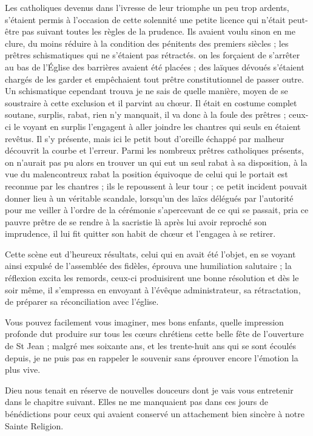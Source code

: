 \documentclass[11pt,a4paper]{report}
\begin{document}
Les catholiques devenus dans l'ivresse de leur triomphe un peu trop ardents, s'étaient permis à l'occasion de cette solennité une petite licence qui n'était peut-être pas suivant toutes les règles de la prudence. Ils avaient voulu sinon en me clure, du moins réduire à la condition des pénitents des premiers siècles ; les prêtres schismatiques qui ne s'étaient pas rétractés. on les forçaient de s'arrêter au bas de l'Église des barrières avaient été placées ; des laïques dévoués s'étaient chargés de les garder et empêchaient tout prêtre constitutionnel de passer outre. Un schismatique cependant trouva je ne sais de quelle manière, moyen de se soustraire à cette exclusion et il parvint au chœur. Il était en costume complet soutane, surplis, rabat, rien n'y manquait, il va donc à la foule des prêtres ; ceux-ci le voyant en surplis l'engagent à aller joindre les chantres qui seuls en étaient revêtus. Il s'y présente, mais ici le petit bout d'oreille échappé par malheur découvrit la courbe et l'erreur. Parmi les nombreux prêtres catholiques présents, on n'aurait pas pu alors en trouver un qui eut un seul rabat à sa disposition, à la vue du malencontreux rabat la position équivoque de celui qui le portait est reconnue par les chantres ; ils le repoussent à leur tour ; ce petit incident pouvait donner lieu à un véritable scandale, lorsqu'un des laïcs délégués par l'autorité pour me veiller à l'ordre de la cérémonie s'apercevant de ce qui se passait, pria ce pauvre prêtre de se rendre à la sacristie là après lui avoir reproché son imprudence, il lui fit quitter son habit de chœur et l'engagea à se retirer.

Cette scène eut d'heureux résultats, celui qui en avait été l'objet, en se voyant ainsi expulsé de l'assemblée des fidèles, éprouva une humiliation salutaire ; la réflexion excita les remords, ceux-ci produisirent une bonne résolution et dès le soir même, il s'empressa en envoyant à l'évêque administrateur, sa rétractation, de préparer sa réconciliation avec l'église.

Vous pouvez facilement vous imaginer, mes bons enfants, quelle impression profonde dut produire sur tous les cœurs chrétiens cette belle fête de l'ouverture de St Jean ; malgré mes soixante ans, et les trente-huit ans qui se sont écoulés depuis, je ne puis pas en rappeler le souvenir sans éprouver encore l'émotion la plus vive.

Dieu nous tenait en réserve de nouvelles douceurs dont je vais vous entretenir dans le chapitre suivant. Elles ne me manquaient pas dans ces jours de bénédictions pour ceux qui avaient conservé un attachement bien sincère à notre Sainte Religion.
\end{document}
